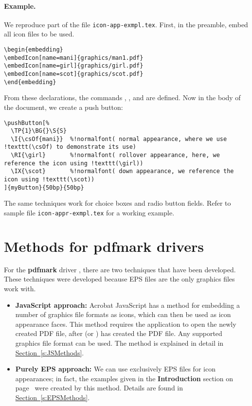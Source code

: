 \documentclass{article}
\def\psf#1{\textsf{\textbf{#1}}}
\def\mpFmt{\raggedleft\itshape\small}
\begin{document}
\paragraph*{Example.} We reproduce part of the file \texttt{icon-app-exmpl.tex}. First, in the preamble,
embed all icon files to be used.
\begin{Verbatim}[xleftmargin=\parindent,fontsize=\small]
\begin{embedding}
\embedIcon[name=mani]{graphics/man1.pdf}
\embedIcon[name=girl]{graphics/girl.pdf}
\embedIcon[name=scot]{graphics/scot.pdf}
\end{embedding}
\end{Verbatim}
From these declarations, the commands , , and  are
defined. Now in the body of the document, we create a push button:
\begin{Verbatim}[xleftmargin=\parindent,commandchars=!(),fontsize=\small]
\pushButton[%
  \TP{1}\BG{}\S{S}
  \I{\csOf{mani}}  %!normalfont( normal appearance, where we use !texttt(\csOf) to demonstrate its use)
  \RI{\girl}       %!normalfont( rollover appearance, here, we reference the icon using !texttt(\girl))
  \IX{\scot}       %!normalfont( down appearance, we reference the icon using !texttt(\scot))
]{myButton}{50bp}{50bp}
\end{Verbatim}
The same techniques work for choice boxes and radio button fields. Refer to sample file \texttt{icon-appr-exmpl.tex}
for a working example.

\section{Methods for \textsf{pdfmark} drivers}

For the \psf{pdfmark} driver \marginpar{\mpFmt\sffamily dvips}, there
are two techniques that have been developed. These techniques were developed because
EPS files are the only graphics files  work with.
\begin{itemize}
   \item \textbf{JavaScript approach:} Acrobat JavaScript has a method for
       embedding a number of graphics file formats as icons, which can then
       be used as icon appearance faces. This method requires the
        application to open the newly created PDF file, after
        (or ) has created the PDF file. Any
       supported graphics file format can be used. The method is explained
       in detail in \hyperref[s:JSMethods]{Section~\ref*{s:JSMethods}}.

   \item \textbf{Purely EPS approach:} We can use exclusively EPS files for
       icon appearances; in fact, the examples given in the
       \textbf{Introduction} section on page~\pageref{intro} were created by this
       method. Details are found in \hyperref[s:EPSMethods]{Section~\ref*{s:EPSMethods}}.
\end{itemize}
\end{document}
